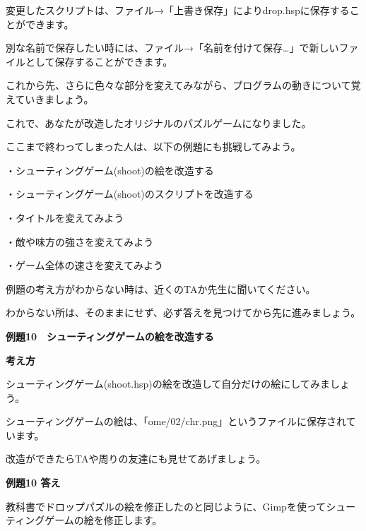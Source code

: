 \documentclass[a4paper,dvipdfmx]{jarticle}
\newcommand\textstyleqwerty[1]{#1}
\begin{document}
\bigskip

変更したスクリプトは、ファイル→「上書き保存」によりdrop.hspに保存することができます。

別な名前で保存したい時には、ファイル→「名前を付けて保存…」で新しいファイルとして保存することができます。

これから先、さらに色々な部分を変えてみながら、プログラムの動きについて覚えていきましょう。


\bigskip

これで、あなたが改造したオリジナルのパズルゲームになりました。



\bigskip

ここまで終わってしまった人は、以下の例題にも挑戦してみよう。


\bigskip

・シューティングゲーム(shoot)の絵を改造する

・シューティングゲーム(shoot)のスクリプトを改造する

・タイトルを変えてみよう

・敵や味方の強さを変えてみよう

・ゲーム全体の速さを変えてみよう


\bigskip

例題の考え方がわからない時は、近くのTAか先生に聞いてください。

わからない所は、そのままにせず、必ず答えを見つけてから先に進みましょう。


\bigskip

\clearpage
\textstyleqwerty{\textbf{例題10　シューティングゲームの絵を改造する}}


\bigskip

{\bfseries
考え方}


\bigskip

シューティングゲーム(shoot.hsp)の絵を改造して自分だけの絵にしてみましょう。

シューティングゲームの絵は、「ome/02/chr.png」というファイルに保存されています。

改造ができたらTAや周りの友達にも見せてあげましょう。


\bigskip


\bigskip

{\bfseries
例題10 答え}


\bigskip

教科書でドロップパズルの絵を修正したのと同じように、Gimpを使ってシューティングゲームの絵を修正します。


\bigskip
\end{document}
